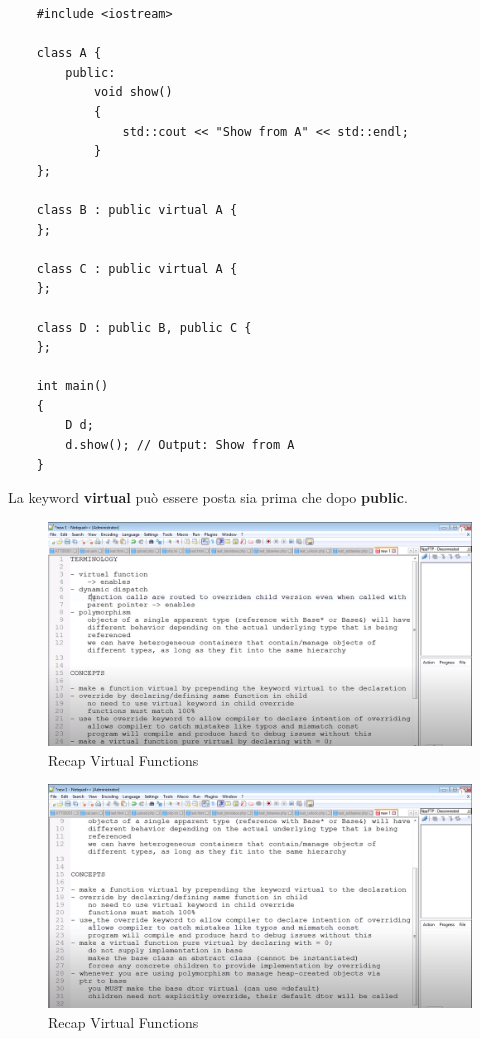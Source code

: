 \begin{lstlisting}
	#include <iostream>
	
	class A {
		public:
			void show()
			{
				std::cout << "Show from A" << std::endl;
			}
	};

	class B : public virtual A {
	};

	class C : public virtual A {
	};

	class D : public B, public C {
	};

	int main()
	{
		D d;
		d.show(); // Output: Show from A
	}
\end{lstlisting}

\textsf{\small La keyword \textbf{virtual} può essere posta sia prima che dopo \textbf{public}.} \\

\begin{figure}[H]
	\centering
	\includegraphics[width=1.2\textwidth, height=1.2\textheight, keepaspectratio]{./imgs/virtual_functions_recap_terminology_and_concepts1.png}
	\caption{Recap Virtual Functions}
	\label{fig:virtual_functions_recap_terminology_and_concepts1}
\end{figure}

\begin{figure}[H]
	\centering
	\includegraphics[width=1.2\textwidth, height=1.2\textheight, keepaspectratio]{./imgs/virtual_functions_recap_terminology_and_concepts2.png}
	\caption{Recap Virtual Functions}
	\label{fig:virtual_functions_recap_terminology_and_concepts2}
\end{figure}

